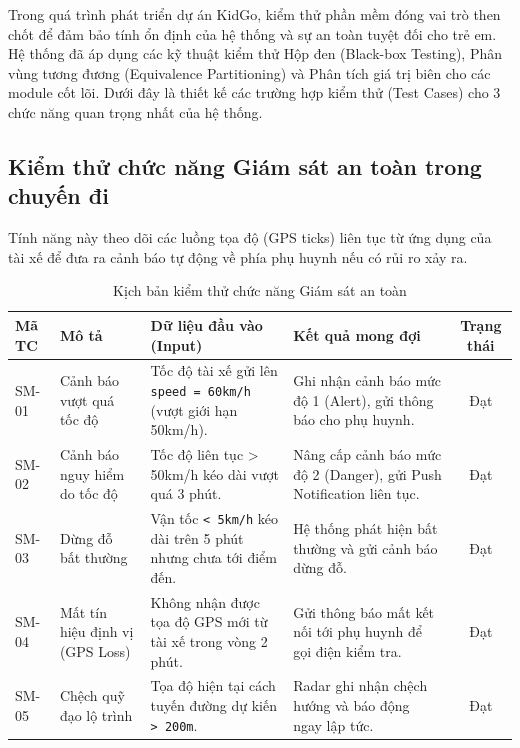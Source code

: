 \documentclass[../DoAn.tex]{subfiles}
\begin{document}
Trong quá trình phát triển dự án KidGo, kiểm thử phần mềm đóng vai trò then chốt để đảm bảo tính ổn định của hệ thống và sự an toàn tuyệt đối cho trẻ em. Hệ thống đã áp dụng các kỹ thuật kiểm thử Hộp đen (Black-box Testing), Phân vùng tương đương (Equivalence Partitioning) và Phân tích giá trị biên cho các module cốt lõi. Dưới đây là thiết kế các trường hợp kiểm thử (Test Cases) cho 3 chức năng quan trọng nhất của hệ thống.

\newpage
\subsection{Kiểm thử chức năng Giám sát an toàn trong chuyến đi}
Tính năng này theo dõi các luồng tọa độ (GPS ticks) liên tục từ ứng dụng của tài xế để đưa ra cảnh báo tự động về phía phụ huynh nếu có rủi ro xảy ra.

\begin{table}[H]
    \centering
    \caption{Kịch bản kiểm thử chức năng Giám sát an toàn}
    \begin{tabular}{|l|p{3.5cm}|p{4.5cm}|p{4.5cm}|c|}
        \hline
        \textbf{Mã TC} & \textbf{Mô tả}                  & \textbf{Dữ liệu đầu vào (Input)}                                      & \textbf{Kết quả mong đợi}                                            & \textbf{Trạng thái} \\ \hline
        SM-01          & Cảnh báo vượt quá tốc độ        & Tốc độ tài xế gửi lên \texttt{speed = 60km/h} (vượt giới hạn 50km/h). & Ghi nhận cảnh báo mức độ 1 (Alert), gửi thông báo cho phụ huynh.     & Đạt                 \\ \hline
        SM-02          & Cảnh báo nguy hiểm do tốc độ    & Tốc độ liên tục > 50km/h kéo dài vượt quá 3 phút.                     & Nâng cấp cảnh báo mức độ 2 (Danger), gửi Push Notification liên tục. & Đạt                 \\ \hline
        SM-03          & Dừng đỗ bất thường              & Vận tốc \texttt{< 5km/h} kéo dài trên 5 phút nhưng chưa tới điểm đến. & Hệ thống phát hiện bất thường và gửi cảnh báo dừng đỗ.               & Đạt                 \\ \hline
        SM-04          & Mất tín hiệu định vị (GPS Loss) & Không nhận được tọa độ GPS mới từ tài xế trong vòng 2 phút.           & Gửi thông báo mất kết nối tới phụ huynh để gọi điện kiểm tra.        & Đạt                 \\ \hline
        SM-05          & Chệch quỹ đạo lộ trình          & Tọa độ hiện tại cách tuyến đường dự kiến \texttt{> 200m}.             & Radar ghi nhận chệch hướng và báo động ngay lập tức.                 & Đạt                 \\ \hline
    \end{tabular}
\end{table}
\end{document}
